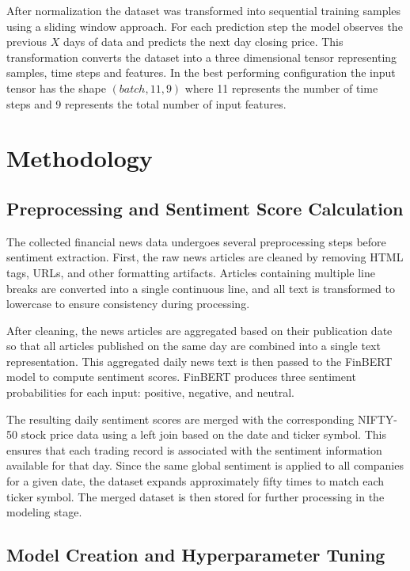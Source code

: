 \documentclass[11pt]{article}
\begin{document}
After normalization the dataset was transformed into sequential training samples using a sliding window approach. For each prediction step the model observes the previous $X$ days of data and predicts the next day closing price. This transformation converts the dataset into a three dimensional tensor representing samples, time steps and features. In the best performing configuration the input tensor has the shape $(batch,11,9)$ where 11 represents the number of time steps and 9 represents the total number of input features.

\section{Methodology}

\subsection{Preprocessing and Sentiment Score Calculation}

The collected financial news data undergoes several preprocessing steps before sentiment extraction. First, the raw news articles are cleaned by removing HTML tags, URLs, and other formatting artifacts. Articles containing multiple line breaks are converted into a single continuous line, and all text is transformed to lowercase to ensure consistency during processing.

After cleaning, the news articles are aggregated based on their publication date so that all articles published on the same day are combined into a single text representation. This aggregated daily news text is then passed to the FinBERT model to compute sentiment scores. FinBERT produces three sentiment probabilities for each input: positive, negative, and neutral.

The resulting daily sentiment scores are merged with the corresponding NIFTY-50 stock price data using a left join based on the date and ticker symbol. This ensures that each trading record is associated with the sentiment information available for that day. Since the same global sentiment is applied to all companies for a given date, the dataset expands approximately fifty times to match each ticker symbol. The merged dataset is then stored for further processing in the modeling stage.


\subsection{Model Creation and Hyperparameter Tuning}
\end{document}
